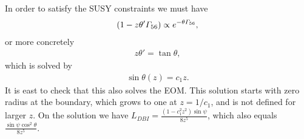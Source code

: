 \documentclass[11pt]{article}
\let\oldGamma=\Gamma
\renewcommand{\Gamma}{\mathnormal{\oldGamma}}
\begin{document}
In order to satisfy the SUSY constraints we must have
\begin{align}
\left(1 - z\theta' \Gamma_{56}\right)  \propto e^{-\theta\Gamma_{56}},
\end{align}
or more concretely
\begin{align}
 z\theta'  = \tan\theta,
\end{align}
which is solved by
\begin{align}
\sin \theta(z) = c_1 z.
\end{align}
It is east to check that this also solves the EOM.
This solution starts with zero radius at the boundary, which grows to one at $z = 1/c_1$, and is not defined for larger $z$.
On the solution we have $L_{DBI} = \frac{\left(1-c_1^2 z^2\right) \sin \psi }{8 z^5}$, which also equals $\frac{\sin\psi\cos^2\theta}{8 z^5}$.
\end{document}
